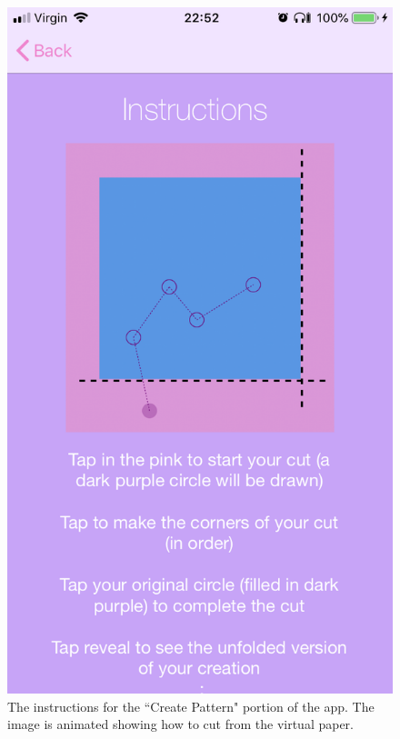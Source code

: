 \documentclass[11pt]{article}
\begin{document}
               \begin{figure}[!ht]
                                \begin{minipage}{0.45\textwidth}
                                    \centering \includegraphics[width=0.7\linewidth]{KiriZen/instructionsCreate}
                                    \caption{The instructions for the ``Create Pattern" portion of the app. The image is animated showing how to cut from the virtual paper.}
                                    \label{fig:kiriZen-instructionsCreate}
                                \end{minipage}\hfill
                                \begin{minipage}{0.45\textwidth}
                                    \centering

\end{minipage}
\end{figure}
\end{document}
